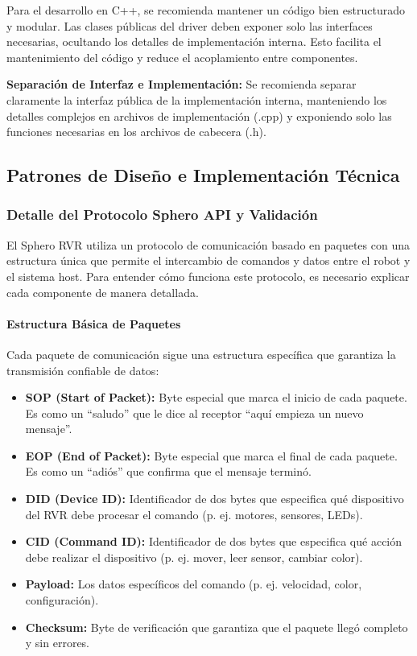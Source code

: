 \documentclass[11pt]{article}
\numberwithin{figure}{section}
\numberwithin{table}{section}
\begin{document}
Para el desarrollo en C++, se recomienda mantener un código bien estructurado y modular. Las clases públicas del driver deben exponer solo las interfaces necesarias, ocultando los detalles de implementación interna. Esto facilita el mantenimiento del código y reduce el acoplamiento entre componentes.

\textbf{Separación de Interfaz e Implementación:} Se recomienda separar claramente la interfaz pública de la implementación interna, manteniendo los detalles complejos en archivos de implementación (.cpp) y exponiendo solo las funciones necesarias en los archivos de cabecera (.h).


\subsection{Patrones de Diseño e Implementación Técnica}


\subsubsection{Detalle del Protocolo Sphero API y Validación}

El Sphero RVR utiliza un protocolo de comunicación basado en paquetes con una estructura única que permite el intercambio de comandos y datos entre el robot y el sistema host. Para entender cómo funciona este protocolo, es necesario explicar cada componente de manera detallada.

\paragraph{Estructura Básica de Paquetes}
Cada paquete de comunicación sigue una estructura específica que garantiza la transmisión confiable de datos:

\begin{itemize}
    \item \textbf{SOP (Start of Packet):} Byte especial que marca el inicio de cada paquete. Es como un ``saludo'' que le dice al receptor ``aquí empieza un nuevo mensaje''.
    \item \textbf{EOP (End of Packet):} Byte especial que marca el final de cada paquete. Es como un ``adiós'' que confirma que el mensaje terminó.
    \item \textbf{DID (Device ID):} Identificador de dos bytes que especifica qué dispositivo del RVR debe procesar el comando (p. ej. motores, sensores, LEDs).
    \item \textbf{CID (Command ID):} Identificador de dos bytes que especifica qué acción debe realizar el dispositivo (p. ej. mover, leer sensor, cambiar color).
    \item \textbf{Payload:} Los datos específicos del comando (p. ej. velocidad, color, configuración).
    \item \textbf{Checksum:} Byte de verificación que garantiza que el paquete llegó completo y sin errores.
\end{itemize}
\end{document}
